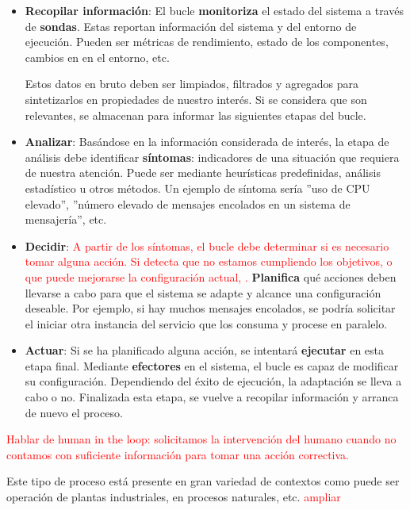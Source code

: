 \begin{itemize}
  \item \textbf{Recopilar información}: El bucle \textbf{monitoriza} el estado del sistema a través de \textbf{sondas}. Estas reportan información del sistema y del entorno de ejecución. Pueden ser métricas de rendimiento, estado de los componentes, cambios en en el entorno, etc.

  Estos datos en bruto deben ser limpiados, filtrados y agregados para sintetizarlos en propiedades de nuestro interés. Si se considera que son relevantes, se almacenan para informar las siguientes etapas del bucle.

  \item \textbf{Analizar}: Basándose en la información considerada de interés, la etapa de análisis debe identificar \textbf{síntomas}: indicadores de una situación que requiera de nuestra atención. Puede ser mediante heurísticas predefinidas, análisis estadístico u otros métodos. Un ejemplo de síntoma sería ''uso de CPU elevado'', ''número elevado de mensajes encolados en un sistema de mensajería'', etc.

  \item \textbf{Decidir}: \textcolor{red}{A partir de los síntomas, el bucle debe determinar si es necesario tomar alguna acción. Si detecta que no estamos cumpliendo los objetivos, o que puede mejorarse la configuración actual, .} \textbf{Planifica} qué acciones deben llevarse a cabo para que el sistema se adapte y alcance una configuración deseable. Por ejemplo, si hay muchos mensajes encolados, se podría solicitar el iniciar otra instancia del servicio que los consuma y procese en paralelo.

  \item \textbf{Actuar}: Si se ha planificado alguna acción, se intentará \textbf{ejecutar} en esta etapa final. Mediante \textbf{efectores} en el sistema, el bucle es capaz de modificar su configuración. Dependiendo del éxito de ejecución, la adaptación se lleva a cabo o no. Finalizada esta etapa, se vuelve a recopilar información y arranca de nuevo el proceso.
\end{itemize}


\textcolor{red}{Hablar de human in the loop: solicitamos la intervención del humano cuando no contamos con suficiente información para tomar una acción correctiva.}

Este tipo de proceso está presente en gran variedad de contextos como puede ser operación de plantas industriales, \cite{climentpenadesDissenyPrototipatSolucions2020a}  en procesos naturales, etc. \textcolor{red}{ampliar}

